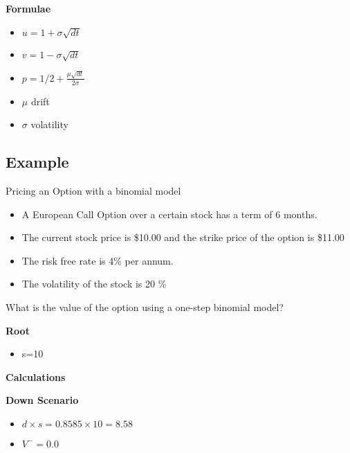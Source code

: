 \textbf{Formulae}
\begin{itemize}
\item $u = 1 + \sigma \sqrt{dt}$
\item $v = 1 - \sigma \sqrt{dt}$
\item $p = 1/2 + \frac{\mu \sqrt{dt}}{2\sigma}$
\end{itemize}

\begin{itemize}
\item $\mu$ drift
\item $\sigma$ volatility
\end{itemize}




\subsection*{Example}  %

Pricing an Option with a binomial model

\begin{itemize}
\item A European Call Option over a certain stock has a term of 6 months.
\item The current stock price is \$10.00 and the strike price of the option is \$11.00
\item The risk free rate is 4\% per annum.
\item The volatility of the stock is 20 \%
\end{itemize}

What is the value of the option using a one-step binomial  model?

\textbf{Root}\\
\begin{itemize}
\item s=10
\end{itemize}

\textbf{Calculations}

\textbf{Down Scenario} \\
\begin{itemize}
\item $d \times s= 0.8585 \times 10 = 8.58$
\item $V^{-} = 0.0$
\end{itemize}




